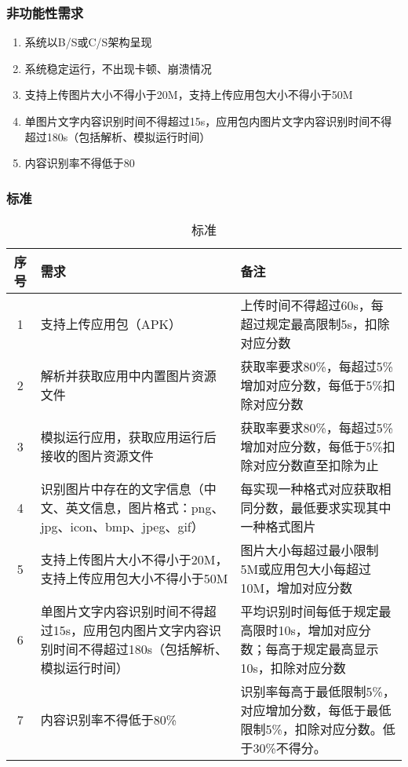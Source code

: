 \documentclass[UTF8]{ctexart}
\begin{document}
			\subsubsection{非功能性需求}
				\begin{enumerate}
					\item 系统以B/S或C/S架构呈现
					\item 系统稳定运行，不出现卡顿、崩溃情况
					\item 支持上传图片大小不得小于20M，支持上传应用包大小不得小于50M
					\item 单图片文字内容识别时间不得超过15s，应用包内图片文字内容识别时间不得超过180s（包括解析、模拟运行时间）
					\item 内容识别率不得低于80%
				\end{enumerate}
			\subsubsection{标准}
				\begin{table}
					\caption{标准}
					\centering
					\begin{tabular}{cp{5.5cm}p{5.5cm}}
						\toprule[1.5pt]
						\textbf{序号} & \textbf{需求} & \textbf{备注}\\
						\midrule[1pt]
						1 & 支持上传应用包（APK） & 上传时间不得超过60s，每超过规定最高限制5s，扣除对应分数\\
						2 & 解析并获取应用中内置图片资源文件 & 获取率要求80\%，每超过5\%增加对应分数，每低于5\%扣除对应分数\\
						3 & 模拟运行应用，获取应用运行后接收的图片资源文件 & 获取率要求80\%，每超过5\%增加对应分数，每低于5\%扣除对应分数直至扣除为止\\
						4 & 识别图片中存在的文字信息（中文、英文信息，图片格式：png、jpg、icon、bmp、jpeg、gif） & 每实现一种格式对应获取相同分数，最低要求实现其中一种格式图片\\
						5 & 支持上传图片大小不得小于20M，支持上传应用包大小不得小于50M & 图片大小每超过最小限制5M或应用包大小每超过10M，增加对应分数\\
						6 & 单图片文字内容识别时间不得超过15s，应用包内图片文字内容识别时间不得超过180s（包括解析、模拟运行时间） & 平均识别时间每低于规定最高限时10s，增加对应分数；每高于规定最高显示10s，扣除对应分数\\
						7 & 内容识别率不得低于80\% & 识别率每高于最低限制5\%，对应增加分数，每低于最低限制5\%，扣除对应分数。低于30\%不得分。\\
						\bottomrule[1.5pt]
					\end{tabular}
				\end{table}
\end{document}
